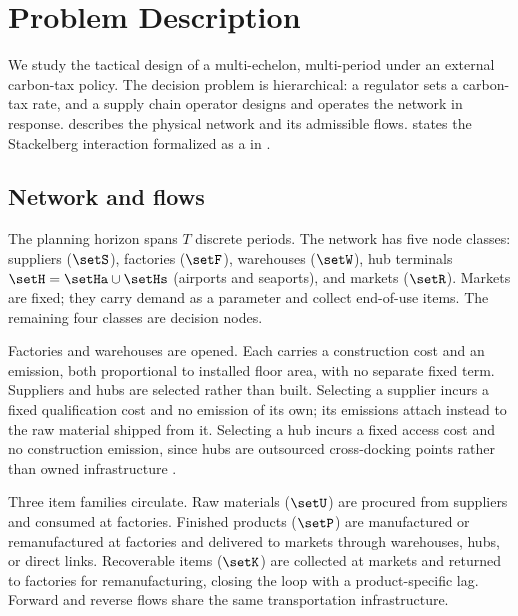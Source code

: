 
\section{Problem Description}
\label{sec:problem}

We study the tactical design of a multi-echelon, multi-period \CLSC
under an external carbon-tax policy. The decision problem is
hierarchical: a regulator sets a carbon-tax rate, and a supply chain
operator designs and operates the network in response.
 describes the physical network and its
admissible flows.  states the Stackelberg
interaction formalized as a \BLMIP in .

\subsection{Network and flows}
\label{sec:prob:overview}

The planning horizon spans $T$ discrete periods. The network has five
node classes: suppliers ($\setS$), factories ($\setF$), warehouses
($\setW$), hub terminals $\setH=\setHa\cup\setHs$ (airports and
seaports), and markets ($\setR$). Markets are fixed; they carry demand
as a parameter and collect end-of-use items. The remaining four classes
are decision nodes.

Factories and warehouses are opened. Each carries a construction cost
and an emission, both proportional to installed floor area, with no
separate fixed term. Suppliers and hubs are selected rather than built.
Selecting a supplier incurs a fixed qualification cost and no emission
of its own; its emissions attach instead to the raw material shipped
from it. Selecting a hub incurs a fixed access cost and no construction
emission, since hubs are outsourced cross-docking points rather than
owned infrastructure \citep{mota2018}.

Three item families circulate. Raw materials ($\setU$) are procured
from suppliers and consumed at factories. Finished products ($\setP$)
are manufactured or remanufactured at factories and delivered to markets
through warehouses, hubs, or direct links. Recoverable items ($\setK$)
are collected at markets and returned to factories for remanufacturing,
closing the loop with a product-specific lag. Forward and reverse flows
share the same transportation infrastructure.

